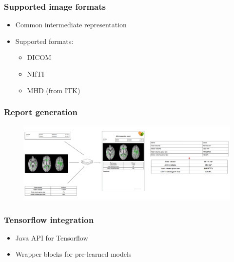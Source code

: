 \documentclass[xetex,mathserif,serif]{beamer}
\begin{document}
\begin{frame}
    \frametitle{Supported image formats}
        \begin{itemize}
            \item Common intermediate representation
            \item Supported formats:
                    \begin{itemize}
                         \item DICOM
                         \item NIfTI
                         \item MHD (from ITK)
                     \end{itemize}
         \end{itemize}
 \end{frame}

  \begin{frame}
     \frametitle{Report generation}
        \begin{figure}[b]
             \centering
             \includegraphics[width=12cm]{pictures/reports.png}
         \end{figure}
 \end{frame}
 
 \begin{frame}
     \frametitle{Tensorflow integration}
        \begin{itemize}
             \item Java API for Tensorflow
             \item Wrapper blocks for pre-learned models
         \end{itemize}
 \end{frame}
 
\end{document}
